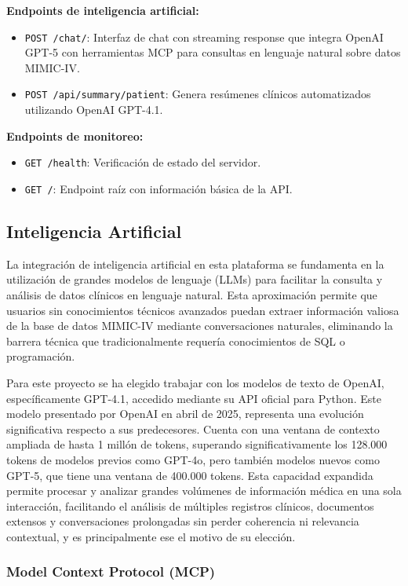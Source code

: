 \textbf{Endpoints de inteligencia artificial:}
\begin{itemize}
\item \texttt{POST /chat/}: Interfaz de chat con streaming response que integra OpenAI GPT-5 con herramientas MCP para consultas en lenguaje natural sobre datos MIMIC-IV.
\item \texttt{POST /api/summary/patient}: Genera resúmenes clínicos automatizados utilizando OpenAI GPT-4.1.
\end{itemize}

\textbf{Endpoints de monitoreo:}
\begin{itemize}
\item \texttt{GET /health}: Verificación de estado del servidor.
\item \texttt{GET /}: Endpoint raíz con información básica de la API.
\end{itemize}

\newpage
\subsection{Inteligencia Artificial}

La integración de inteligencia artificial en esta plataforma se fundamenta en la utilización de grandes modelos de lenguaje (LLMs) para facilitar la consulta y análisis de datos clínicos en lenguaje natural. Esta aproximación permite que usuarios sin conocimientos técnicos avanzados puedan extraer información valiosa de la base de datos MIMIC-IV mediante conversaciones naturales, eliminando la barrera técnica que tradicionalmente requería conocimientos de SQL o programación.

Para este proyecto se ha elegido trabajar con los modelos de texto de OpenAI, específicamente GPT-4.1, accedido mediante su API oficial para Python. Este modelo presentado por OpenAI en abril de 2025, representa una evolución significativa respecto a sus predecesores. Cuenta con una ventana de contexto ampliada de hasta 1 millón de tokens, superando significativamente los 128.000 tokens de modelos previos como GPT-4o, pero también modelos nuevos como GPT-5, que tiene una ventana de 400.000 tokens. Esta capacidad expandida permite procesar y analizar grandes volúmenes de información médica en una sola interacción, facilitando el análisis de múltiples registros clínicos, documentos extensos y conversaciones prolongadas sin perder coherencia ni relevancia contextual, y es principalmente ese el motivo de su elección.

\subsubsection{Model Context Protocol (MCP)}

